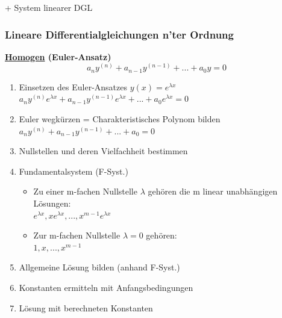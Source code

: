 \documentclass[6pt]{article}
\begin{document}
\begin{multicols*}{3}
	
	
	+ System linearer DGL 
	
	
	
	
	
	
	\vfill\eject
	
	\subsubsection*{Lineare Differentialgleichungen n'ter Ordnung}
	
	
	{\bf \underline{Homogen} (Euler-Ansatz)}  \\
		
		\[a_{n}y^{(n)} + a_{n-1}y^{(n-1)} + ... + a_{0}y = 0\]
		
		\begin{enumerate}[label=(\roman*), itemsep=2pt, parsep=3pt ]
			\item 	Einsetzen des Euler-Ansatzes $y(x) = e^{\lambda x}$ \\
						$a_{n}y^{(n)}e^{\lambda x} + a_{n-1}y^{(n-1)}e^{\lambda x} + ... + a_{0}e^{\lambda x} = 0$
			\item 	Euler wegk{\"u}rzen = Charakteristisches Polynom bilden	\\
						$a_{n}y^{(n)} + a_{n-1}y^{(n-1)} + ... + a_{0} = 0$	
			\item 	Nullstellen und deren Vielfachheit bestimmen
			\item 	Fundamentalsystem (F-Syst.)
						\begin{itemize}[itemsep=2pt, parsep=3pt ]
								\item Zu einer m-fachen Nullstelle $\lambda$ geh{\"o}ren die m linear unabh{\"a}ngigen L{\"o}sungen: \\
									$e^{\lambda x}, x e^{\lambda x}, ... ,x^{m-1} e^{\lambda x}$
								\item Zur m-fachen Nullstelle $\lambda = 0$ geh{\"o}ren: \\
											$1, x, ..., x^{m-1}$
						\end{itemize}
			\item 	Allgemeine L{\"o}sung bilden (anhand F-Syst.)
			\item 	Konstanten ermitteln mit Anfangsbedingungen
			\item 	L{\"o}sung mit berechneten Konstanten
		\end{enumerate}	
	

\end{multicols*}
\end{document}
